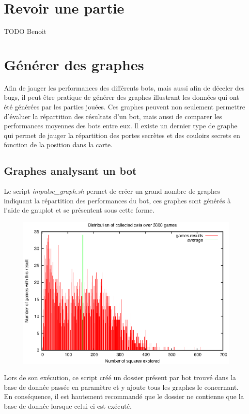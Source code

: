\documentclass[10pt,a4paper]{report}
\begin{document}
\section{Revoir une partie}
TODO Benoit
\section{Générer des graphes}
Afin de jauger les performances des différents bots, mais aussi afin de
déceler des bugs, il peut être pratique de générer des graphes illustrant les
données qui ont été générées par les parties jouées. Ces graphes peuvent
non seulement permettre d'évaluer la répartition des résultats d'un bot,
mais aussi de comparer les performances moyennes des bots entre eux. Il existe
un dernier type de graphe qui permet de jauger la répartition des portes
secrètes et des couloirs secrets en fonction de la position dans la carte.

\subsection{Graphes analysant un bot}
Le script \emph{impulse\_graph.sh} permet de créer un grand nombre de graphes
indiquant la répartition des performances du bot, ces graphes sont générés à
l'aide de gnuplot et se présentent sous cette forme.

\begin{figure}[htb]
  \centering
  \includegraphics[width=120mm]{impulse_graph.eps}
\end{figure}

Lors de son exécution, ce script créé un dossier présent par bot trouvé dans
la base de donnée passée en paramètre et y ajoute tous les graphes le
concernant. En conséquence, il est hautement recommandé que le dossier ne
contienne que la base de donnée lorsque celui-ci est exécuté.
\end{document}
